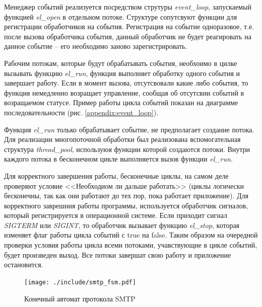 \documentclass[a4paper,12pt]{report}
\begin{document}
    Менеджер событий реализуется посредством струтуры \textit{event\_loop}, запускаемый функцией \textit{el\_open} в отдельном потоке. Структуре сопутсвуют функции для регистрации обработчиков на события. Регистрация на событие одноразовое, т.е. после вызова обработчика события, данный обработчик не будет реагировать на данное событие -- его необходимо заново зарегистрировать. 
    
    Рабочим потокам, которые будут обрабатывать события, необхоимо в цилке вызывать функцию \textit{el\_run}, функция выполняет обработку одного события и завершает работу. Если в момент вызова, отсутсвовали какие либо события, то функция немедленно возращает управление, сообщая об отсутсвии событий в возращаемом статусе. Пример работы цикла событий показан на диаграмме последовательности (рис. \ref{appendix:event_loop}). 

Функция \textit{el\_run} только обрабатывает событие, не предполагает создание потока. Для реализации многопоточной обработки был реализована вспомогательная структура \textit{thread\_pool}, используюя функции которой создаются потоки. Внутри каждого потока в бесконечном цикле выполняется вызов функции \textit{el\_run}. 
    

    
    Для корректного завершения работы, бесконечные циклы, на самом деле проверяют условие <<Необходиом ли дальше работать>> (циклы логически бесконечны, так как они работают до тех пор, пока работает приложение). Для корректного заврешния работы программы, используется обработчик сигналов, который регистрируется в операционной системе. Если приходит сигнал \textit{SIGTERM} или \textit{SIGINT}, то обработчик вызывает функцию \textit{el\_stop}, которая изменяет флаг работы цикла событий с true на false. Таким образом на очередной проверки условия работы цикла всеми потоками, учавствующие в цикле событий, будет произведен выход. Все потоки завершат свою работу и приложение остановится.
    
    \begin{figure}[h]
	\centering
	\texttt{[image: ./include/smtp\_fsm.pdf]}
	\caption{Конечный автомат протокола SMTP}
	\label{fig:smtp_fsm}
\end{figure}
\end{document}
